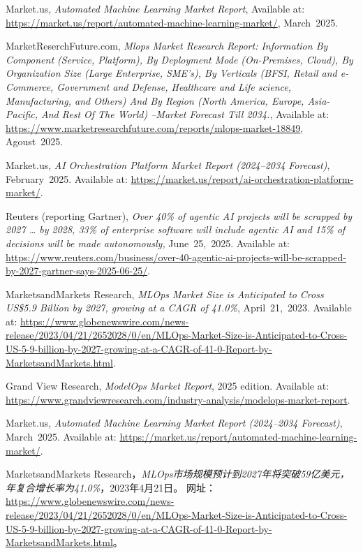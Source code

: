 \documentclass[11点, A4纸, 单面]{article}
\begin{document}
\begin{thebibliography}{99}
    Market.us, \textit{Automated Machine Learning Market Report}, Available at: \url{https://market.us/report/automated-machine-learning-market/}, March~2025.
    
    MarketReserchFuture.com, \textit{Mlops Market Research Report: Information By Component (Service, Platform), By Deployment Mode (On-Premises, Cloud), By Organization Size (Large Enterprise, SME's), By Verticals (BFSI, Retail and e-Commerce, Government and Defense, Healthcare and Life science, Manufacturing, and Others) And By Region (North America, Europe, Asia-Pacific, And Rest Of The World) –Market Forecast Till 2034.}, Available at: \url{https://www.marketresearchfuture.com/reports/mlops-market-18849}, Agoust~2025.
    
    Market.us, \textit{AI Orchestration Platform Market Report (2024--2034 Forecast)}, February~2025.  
    Available at: \url{https://market.us/report/ai-orchestration-platform-market/}.

    Reuters (reporting Gartner), \textit{Over 40\% of agentic AI projects will be scrapped by 2027 … by 2028, 33\% of enterprise software will include agentic AI and 15\% of decisions will be made autonomously,} June~25,~2025.  
    Available at: \url{https://www.reuters.com/business/over-40-agentic-ai-projects-will-be-scrapped-by-2027-gartner-says-2025-06-25/}.

    MarketsandMarkets Research, \textit{MLOps Market Size is Anticipated to Cross US\$5.9 Billion by 2027, growing at a CAGR of 41.0\%}, April~21,~2023.  
    Available at: \url{https://www.globenewswire.com/news-release/2023/04/21/2652028/0/en/MLOps-Market-Size-is-Anticipated-to-Cross-US-5-9-billion-by-2027-growing-at-a-CAGR-of-41-0-Report-by-MarketsandMarkets.html}.

    Grand View Research, \textit{ModelOps Market Report}, 2025 edition.  
    Available at: \url{https://www.grandviewresearch.com/industry-analysis/modelops-market-report}.

    Market.us, \textit{Automated Machine Learning Market Report (2024--2034 Forecast)}, March~2025.  
    Available at: \url{https://market.us/report/automated-machine-learning-market/}.

    MarketsandMarkets Research，\textit{MLOps市场规模预计到2027年将突破59亿美元，年复合增长率为41.0\%}，2023年4月21日。
    网址：\url{https://www.globenewswire.com/news-release/2023/04/21/2652028/0/en/MLOps-Market-Size-is-Anticipated-to-Cross-US-5-9-billion-by-2027-growing-at-a-CAGR-of-41-0-Report-by-MarketsandMarkets.html}。


\end{thebibliography}
\end{document}
